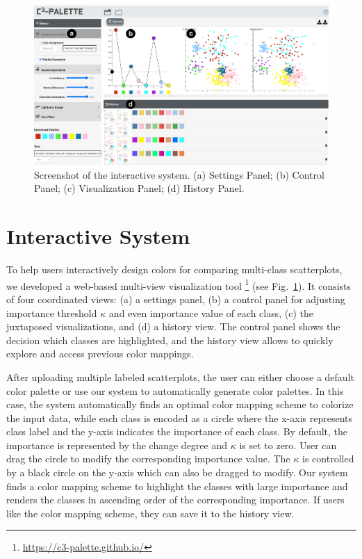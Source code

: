 
\begin{figure}[ht]
\centering
\includegraphics[width=0.8\columnwidth]{figures/interface.pdf}
\caption{Screenshot of the interactive system. (a) Settings Panel; (b) Control Panel; (c) Visualization Panel; (d) History Panel.}
\vspace*{-3mm}
\label{fig:ui}
\end{figure}

\section{Interactive System}
\label{sec:interaction}
To help users interactively design colors for comparing multi-class scatterplots, we developed a web-based multi-view visualization tool \footnote{\small \url{https://c3-palette.github.io/}} (see Fig.~\ref{fig:ui}).
It consists of four coordinated views: (a) a settings panel, (b) a control panel for adjusting importance threshold $\kappa$ and even importance value of each class, (c) the juxtaposed visualizations, and (d) a history view. The control panel shows the decision which classes are highlighted, and the history view allows to quickly explore and access previous color mappings.

After uploading multiple labeled scatterplots, the user can either choose a default color palette or use our system to automatically generate color palettes. In this case, the system automatically finds an optimal color mapping scheme to colorize the input data, while each class is encoded as a circle where the x-axis represents class label and the y-axis indicates the importance of each class. By default, the importance is represented by the change degree and $\kappa$ is set to zero. User can drag the circle to modify the corresponding importance value. The $\kappa$ is controlled by a black circle on the y-axis which can also be dragged to modify. Our system finds a color mapping scheme to highlight the classes with large importance and renders the classes in ascending order of the corresponding importance. If users like the color mapping scheme, they can save it to the history view.


